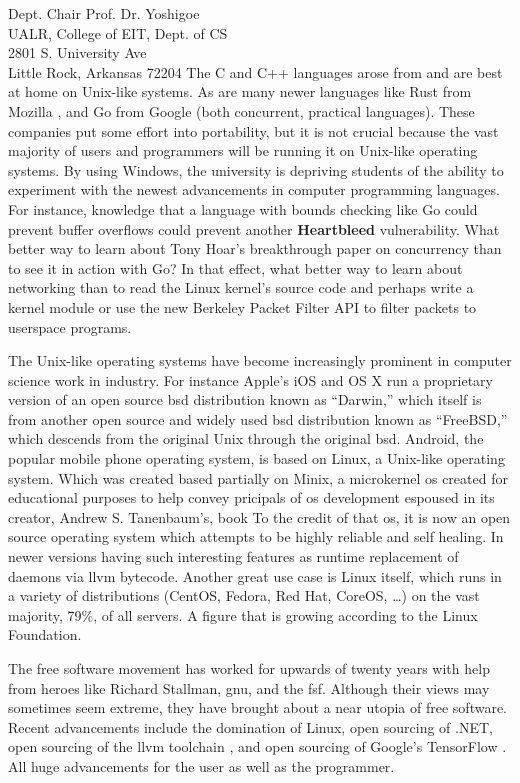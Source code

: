 \documentclass{letter}
\begin{document}
\begin{letter}{
    Dept. Chair Prof. Dr. Yoshigoe \\
    UALR, College of EIT, Dept. of CS \\
    2801 S. University Ave \\
    Little Rock, Arkansas 72204
  }
    The C and C++ languages arose from and are best at home on Unix-like systems. As are many newer languages like Rust from Mozilla \cite{Rustlang}, and Go from Google \cite{Golang} (both concurrent, practical languages). These companies put some effort into portability, but it is not crucial because the vast majority of users and programmers will be running it on Unix-like operating systems. By using Windows, the university is depriving students of the ability to experiment with the newest advancements in computer programming languages. For instance, knowledge that a language with bounds checking like Go could prevent buffer overflows could prevent another {\bf Heartbleed} vulnerability. What better way to learn about Tony Hoar's breakthrough paper on concurrency than to see it in action with Go? In that effect, what better way to learn about networking than to read the Linux kernel's source code and perhaps write a kernel module or use the new Berkeley Packet Filter API to filter packets to userspace programs.

    The Unix-like operating systems have become increasingly prominent in computer science work in industry. For instance Apple's iOS and OS X run a proprietary version of an open source \gls{bsd} distribution known as ``Darwin,'' which itself is from another open source and widely used \gls{bsd} distribution known as ``FreeBSD,'' which descends from the original Unix through the original \gls{bsd}. Android, the popular mobile phone operating system, is based on Linux, a Unix-like operating system. Which was created based partially on Minix, a microkernel \gls{os} created for educational purposes to help convey pricipals of \gls{os} development espoused in its creator, Andrew S. Tanenbaum's, book \cite{Tanenbaum:2005:OSD:1076555} To the credit of that \gls{os}, it is now an open source operating system which attempts to be highly reliable and self healing. In newer versions having such interesting features as runtime replacement of daemons via \gls{llvm} bytecode. Another great use case is Linux itself, which runs in a variety of distributions (CentOS, Fedora, Red Hat, CoreOS, \ldots) on the vast majority, 79\%, of all servers. A figure that is growing according to the Linux Foundation.

    The free software movement has worked for upwards of twenty years with help from heroes like Richard Stallman, \gls{gnu}, and the \gls{fsf}. Although their views may sometimes seem extreme, they have brought about a near utopia of free software. Recent advancements include the domination of Linux, open sourcing of .NET, open sourcing of the \gls{llvm} toolchain \cite{LLVMComp}, and open sourcing of Google's TensorFlow \cite{WiredTensorFlow}. All huge advancements for the user as well as the programmer.


\end{letter}
\end{document}
